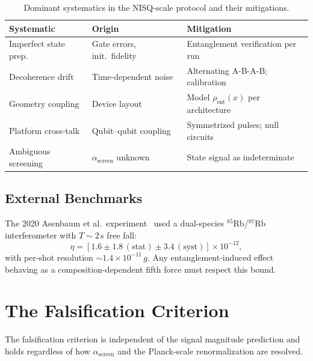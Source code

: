 \documentclass[12pt,letterpaper]{article}
\theoremstyle{plain}
\theoremstyle{definition}
\theoremstyle{remark}
\newcommand{\asc}{\alpha_{\mathrm{screen}}}
\begin{document}
\begin{table}[ht]
\centering\small
\caption{Dominant systematics in the NISQ-scale protocol and their mitigations.}
\label{tab:systematics}
\begin{tabular}{@{}lp{3cm}p{4.5cm}@{}}
\toprule
Systematic & Origin & Mitigation \\
\midrule
Imperfect state prep. & Gate errors, init.\ fidelity & Entanglement verification per run \\
Decoherence drift & Time-dependent noise & Alternating A-B-A-B; calibration \\
Geometry coupling & Device layout & Model $\rho_{\mathrm{ent}}(x)$ per architecture \\
Platform cross-talk & Qubit--qubit coupling & Symmetrized pulses; null circuits \\
Ambiguous screening & $\asc$ unknown & State signal as indeterminate \\
\bottomrule
\end{tabular}
\end{table}

\subsection{External Benchmarks}

The 2020 Asenbaum et al.\ experiment~\cite{Asenbaum2020} used a dual-species
$^{85}$Rb/$^{87}$Rb interferometer with $T \sim 2$\,s free fall:
\begin{equation}
  \eta = [1.6 \pm 1.8\,(\text{stat}) \pm 3.4\,(\text{syst})] \times 10^{-12},
  \label{eq:eta}
\end{equation}
with per-shot resolution $\sim\!1.4\times10^{-11}\,g$.  Any entanglement-induced effect
behaving as a composition-dependent fifth force must respect this bound.

\section{The Falsification Criterion}
\label{sec:falsification}

The falsification criterion is independent of the signal magnitude prediction and holds
regardless of how $\asc$ and the Planck-scale renormalization are resolved.
\end{document}
